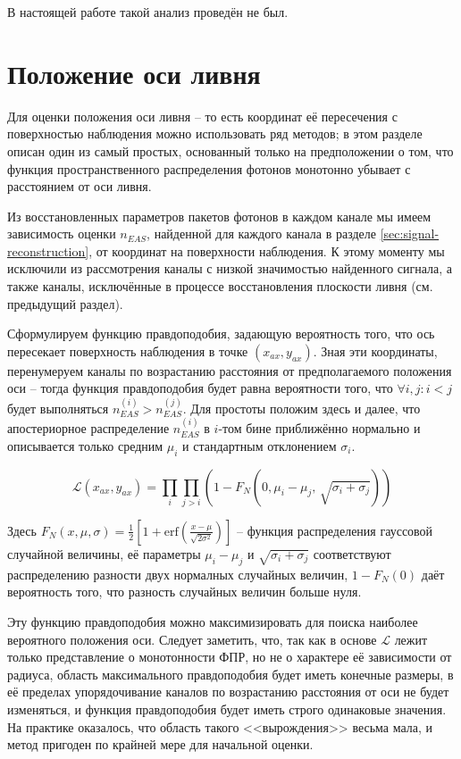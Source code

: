 В настоящей работе такой анализ проведён не был.

\section{Положение оси ливня}

Для оценки положения оси ливня -- то есть координат её пересечения с поверхностью наблюдения можно использовать ряд методов; в этом разделе описан один из самый простых, основанный только на предположении о том, что функция пространственного распределения фотонов монотонно убывает с расстоянием от оси ливня.

Из восстановленных параметров пакетов фотонов в каждом канале мы имеем зависимость оценки $n_{EAS}$, найденной для каждого канала в разделе \ref{sec:signal-reconstruction}, от координат на поверхности наблюдения. К этому моменту мы исключили из рассмотрения каналы с низкой значимостью найденного сигнала, а также каналы, исключённые в процессе восстановления плоскости ливня (см. предыдущий раздел).

Сформулируем функцию правдоподобия, задающую вероятность того, что ось пересекает поверхность наблюдения в точке $(x_{ax}, y_{ax})$. Зная эти координаты, перенумеруем каналы по возрастанию расстояния от предполагаемого положения оси -- тогда функция правдоподобия будет равна вероятности того, что $\forall i, j: i < j$ будет выполняться $n_{EAS}^{(i)} > n_{EAS}^{(j)}$. Для простоты положим здесь и далее, что апостериорное распределение $n_{EAS}^{(i)}$ в $i$-том бине приближённо нормально и описывается только средним $\mu_i$ и стандартным отклонением $\sigma_i$.

\begin{equation}
	\mathcal{L}(x_{ax}, y_{ax}) = \prod_i \prod_{j > i} \left( 1 - F_{N}(0, \mu_i - \mu_j, \, \sqrt{\sigma_i + \sigma_j}) \right)
\end{equation}

Здесь $F_{N}(x, \mu, \sigma) = \frac{1}{2} \left[ 1 + \mathrm{erf} \left( \frac{x - \mu}{\sqrt{2 \sigma^2}} \right) \right]$ -- функция распределения гауссовой случайной величины, её параметры $\mu_i - \mu_j$ и $\sqrt{\sigma_i + \sigma_j}$ соответствуют распределению разности двух нормалных случайных величин, $1 - F_N(0)$ даёт вероятность того, что разность случайных величин больше нуля.

Эту функцию правдоподобия можно максимизировать для поиска наиболее вероятного положения оси. Следует заметить, что, так как в основе $\mathcal{L}$ лежит только представление о монотонности ФПР, но не о характере её зависимости от радиуса, область максимального правдоподобия будет иметь конечные размеры, в её пределах упорядочивание каналов по возрастанию расстояния от оси не будет изменяться, и функция правдоподобия будет иметь строго одинаковые значения. На практике оказалось, что область такого <<вырождения>> весьма мала, и метод пригоден по крайней мере для начальной оценки.


